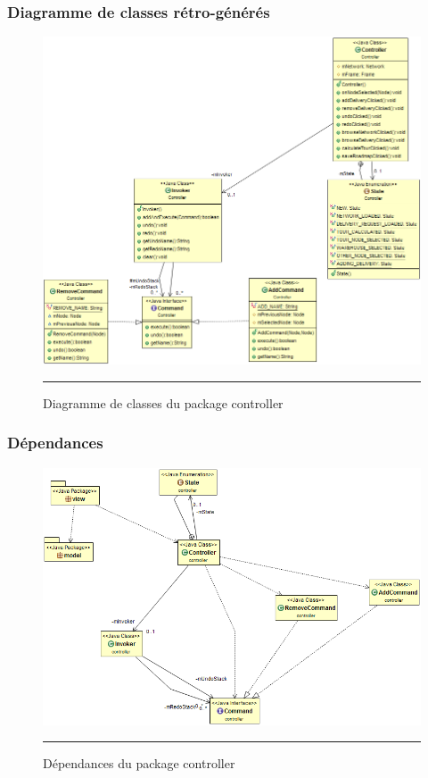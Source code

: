 \subsubsection{Diagramme de classes rétro-générés}
\begin{figure}[H]
	\centering
		\includegraphics[width=\textwidth,height=\textheight,keepaspectratio]{Figures/retro_controller}
		\rule{35em}{0.5pt}
	\caption[Diagramme de classes du package controller]{Diagramme de classes du package controller}
\end{figure}
\subsubsection{Dépendances}

\begin{figure}[H]
	\centering
		\includegraphics[width=\textwidth,height=\textheight,keepaspectratio]{Figures/retro_controller_dep}
		\rule{35em}{0.5pt}
	\caption[Dépendances du package controller]{Dépendances du package controller}
\end{figure}



